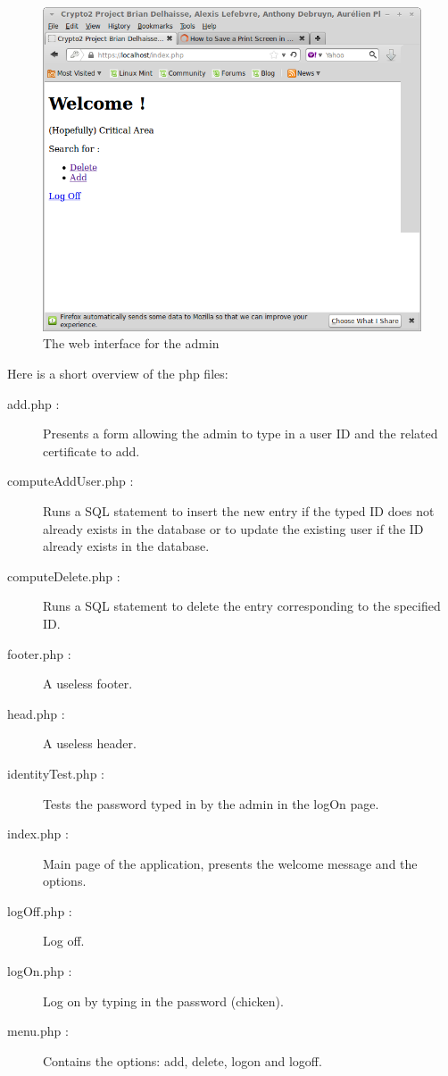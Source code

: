\begin{figure}[H]
	\center
    \includegraphics[scale=0.5]{WebApp.png}
    \caption{The web interface for the admin}
    \label{WebApp}
\end{figure}

Here is a short overview of the php files:\\
\begin{description}
	\item[add.php :]Presents a form allowing the admin to type in a user ID and the related certificate to add.
	\item[computeAddUser.php :]Runs a SQL statement to insert the new entry if the typed ID does not already exists in the database or to update the existing user if the ID already exists in the database.
	\item[computeDelete.php :]Runs a SQL statement to delete the entry corresponding to the specified ID.
	\item[footer.php :]A useless footer.
	\item[head.php :]A useless header.
	\item[identityTest.php :]Tests the password typed in by the admin in the logOn page.
	\item[index.php :]Main page of the application, presents the welcome message and the options.
	\item[logOff.php :] Log off.
	\item[logOn.php :] Log on by typing in the password (chicken).
	\item[menu.php :] Contains the options: add, delete, logon and logoff.
\end{description}


